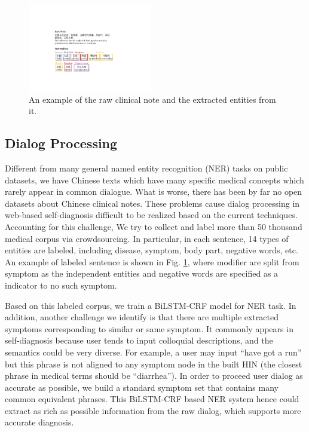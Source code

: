 \documentclass[sigconf]{acmart}
\begin{document}
\begin{figure}[t]
\centering
\includegraphics[width=0.48\textwidth]{fig6.pdf}
\caption{An example of the raw clinical note and the extracted entities from it. \label{fig:6}}
\end{figure}

\subsection{Dialog Processing}\label{sec:ner_system}
Different from many general named entity recognition (NER) tasks on public datasets, we have Chinese texts which have many specific medical concepts which rarely appear in common dialogue. What is worse, there has been by far no open datasets about Chinese clinical notes. These problems cause dialog processing in web-based self-diagnosis difficult to be realized based on the current techniques. Accounting for this challenge, We try to collect and label more than 50 thousand medical corpus via crowdsourcing. In particular, in each sentence, 14 types of entities are labeled, including disease, symptom, body part, negative words, etc. An example of labeled sentence is shown in Fig. \ref{fig:6}, where modifier are split from symptom as the independent entities and negative words are specified as a indicator to no such symptom.

Based on this labeled corpus, we train a BiLSTM-CRF  \cite{huang2015bidirectional} model for NER task. In addition, another challenge we identify is that there are multiple extracted symptoms corresponding to similar or same symptom. It commonly appears in self-diagnosis because user tends to input colloquial descriptions, and the semantics could be very diverse. For example, a user may input ``have got a run'' but this phrase is not aligned to any symptom node in the built HIN (the closest phrase in medical terms should be ``diarrhea''). In order to proceed user dialog as accurate as possible, we build a standard symptom set that contains many common equivalent phrases. This BiLSTM-CRF based NER system hence could extract as rich as possible information from the raw dialog, which supports more accurate diagnosis.
\end{document}
